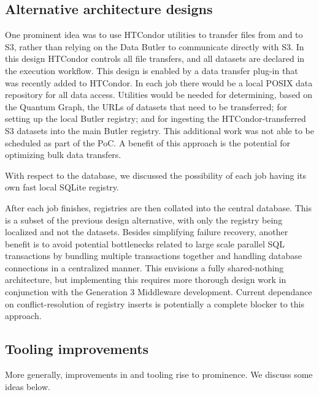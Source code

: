 \subsection{Alternative architecture designs}


One prominent idea was to use HTCondor utilities to transfer files from and to S3, rather than relying on the Data Butler to communicate directly with S3.
In this design HTCondor controls all file transfers, and all datasets are declared in the execution workflow.
This design is enabled by a data transfer plug-in that was recently added to HTCondor.
In each job there would be a local POSIX data repository for all data access.
Utilities would be needed for determining, based on the Quantum Graph, the URLs of datasets that need to be transferred; for setting up the local Butler registry; and for ingesting the HTCondor-transferred S3 datasets into the main Butler registry.
This additional work was not able to be scheduled as part of the PoC.
A benefit of this approach is the potential for optimizing bulk data transfers.

With respect to the database, we discussed the possibility of each job having its own fast local SQLite registry.

After each job finishes, registries are then collated into the central database.
This is a subset of the previous design alternative, with only the registry being localized and not the datasets.
Besides simplifying failure recovery, another benefit is to avoid potential bottlenecks related to large scale parallel SQL transactions by bundling multiple transactions together and handling database connections in a centralized manner.
This envisions a fully shared-nothing architecture, but implementing this requires more thorough design work in conjunction with the Generation 3 Middleware development.
Current dependance on conflict-resolution of registry inserts is potentially a complete blocker to this approach.


\subsection{Tooling improvements}

More generally, improvements in and tooling rise to prominence.
We discuss some ideas below.


